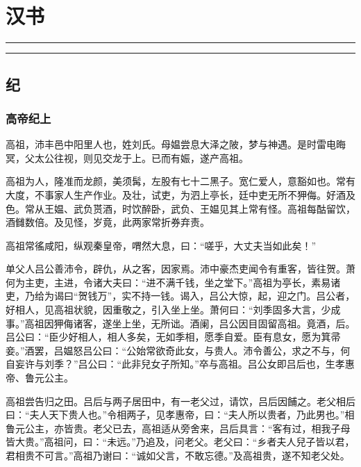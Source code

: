 \documentclass[]{article}
\date{}
\begin{document}
\hypertarget{header-n2}{%
\section{汉书}\label{header-n2}}

\begin{center}\rule{0.5\linewidth}{\linethickness}\end{center}

\tableofcontents

\begin{center}\rule{0.5\linewidth}{\linethickness}\end{center}

\hypertarget{header-n21157}{%
\subsection{纪}\label{header-n21157}}

\hypertarget{header-n7}{%
\subsubsection{高帝纪上}\label{header-n7}}

高祖，沛丰邑中阳里人也，姓刘氏。母媪尝息大泽之陂，梦与神遇。是时雷电晦冥，父太公往视，则见交龙于上。已而有娠，遂产高祖。

高祖为人，隆准而龙颜，美须髯，左股有七十二黑子。宽仁爱人，意豁如也。常有大度，不事家人生产作业。及壮，试吏，为泗上亭长，廷中吏无所不狎侮。好酒及色。常从王媪、武负贳酒，时饮醉卧，武负、王媪见其上常有怪。高祖每酤留饮，酒雠数倍。及见怪，岁竟，此两家常折券弃责。

高祖常徭咸阳，纵观秦皇帝，喟然大息，曰：``嗟乎，大丈夫当如此矣！''

单父人吕公善沛令，辟仇，从之客，因家焉。沛中豪杰吏闻令有重客，皆往贺。萧何为主吏，主进，令诸大夫曰：``进不满千钱，坐之堂下。''高祖为亭长，素易诸吏，乃给为谒曰``贺钱万''，实不持一钱。谒入，吕公大惊，起，迎之门。吕公者，好相人，见高祖状貌，因重敬之，引入坐上坐。萧何曰：``刘季固多大言，少成事。''高祖因狎侮诸客，遂坐上坐，无所诎。酒阑，吕公因目固留高祖。竟酒，后。吕公曰：``臣少好相人，相人多矣，无如季相，愿季自爱。臣有息女，愿为箕帚妾。''酒罢，吕媪怒吕公曰：``公始常欲奇此女，与贵人。沛令善公，求之不与，何自妄许与刘季？''吕公曰：``此非兒女子所知。''卒与高祖。吕公女即吕后也，生孝惠帝、鲁元公主。

高祖尝告归之田。吕后与两子居田中，有一老父过，请饮，吕后因餔之。老父相后曰：``夫人天下贵人也。''令相两子，见孝惠帝，曰：``夫人所以贵者，乃此男也。''相鲁元公主，亦皆贵。老父已去，高祖适从旁舍来，吕后具言：``客有过，相我子母皆大贵。''高祖问，曰：``未远。''乃追及，问老父。老父曰：``乡者夫人兒子皆以君，君相贵不可言。''高祖乃谢曰：``诚如父言，不敢忘德。''及高祖贵，遂不知老父处。
\end{document}

